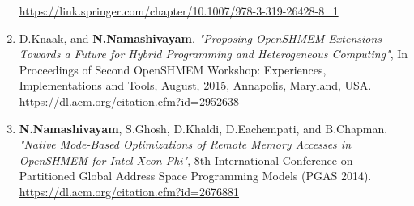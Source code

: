 \begin{enumerate}
      \url{https://link.springer.com/chapter/10.1007/978-3-319-26428-8_1}
\item D.Knaak, and \textbf{N.Namashivayam}.
      \textit{"Proposing OpenSHMEM Extensions Towards a Future for Hybrid
      Programming and Heterogeneous Computing"}, In Proceedings of Second
      OpenSHMEM Workshop: Experiences, Implementations and Tools, August, 2015,
      Annapolis, Maryland, USA.\\
      \url{https://dl.acm.org/citation.cfm?id=2952638}
\item \textbf{N.Namashivayam}, S.Ghosh, D.Khaldi, D.Eachempati, and
      B.Chapman.
      \textit{"Native Mode-Based Optimizations of Remote Memory Accesses in
      OpenSHMEM for Intel Xeon Phi"}, 8th International Conference on Partitioned
      Global Address Space Programming Models (PGAS 2014).\\
      \url{https://dl.acm.org/citation.cfm?id=2676881}
\end{enumerate}


